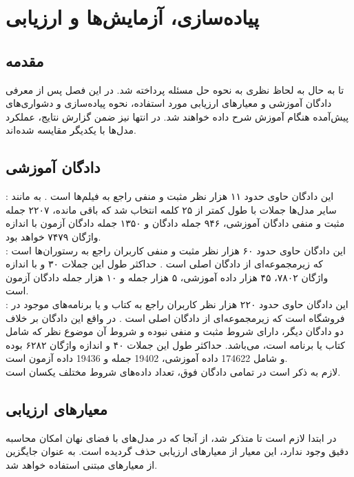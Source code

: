 \chapter{پیاده‌سازی، آزمایش‌ها و ارزیابی}\label{chap4}
\minitoc
\section{مقدمه}
تا به حال به لحاظ نظری به نحوه حل مسئله پرداخته شد. در این فصل پس از معرفی دادگان آموزشی و معیارهای ارزیابی مورد استفاده، نحوه پیاده‌سازی و دشواری‌های پیش‌آمده هنگام آموزش شرح داده خواهند شد. در انتها نیز ضمن گزارش نتایج، عملکرد مدل‌ها با یکدیگر مقایسه شده‌اند.
\section{دادگان آموزشی} \label{chap4:dataset}
:
این دادگان حاوی حدود ۱۱ هزار نظر مثبت و منفی راجع به فیلم‌ها است \cite{sst}. به مانند سایر مدل‌ها جملات با طول کمتر از ۲۵ کلمه انتخاب شد که باقی مانده، ۲۲۰۷ جمله مثبت و منفی دادگان آموزشی، ۹۴۶ جمله دادگان \validation{} و ۱۳۵۰ جمله دادگان آزمون با اندازه واژگان ۷۴۷۹ خواهد بود.
\\
:
این دادگان حاوی حدود ۶۰ هزار نظر مثبت و منفی کاربران راجع به رستوران‌ها است که زیرمجموعه‌ای از دادگان اصلی است
.
حداکثر طول این جملات ۳۰ و با اندازه واژگان ۷۸۰۲، ۴۵ هزار داده آموزشی، ۵ هزار جمله \validation{} و ۱۰ هزار جمله دادگان آزمون است.
\\
:
این دادگان حاوی حدود ۲۲۰ هزار نظر کاربران راجع به کتاب و یا برنامه‌های موجود در فروشگاه  است که زیرمجموعه‌ای از دادگان اصلی است \cite{amazon_review}. در واقع این دادگان بر خلاف دو دادگان دیگر، دارای شروط مثبت و منفی نبوده و شروط آن موضوع نظر که شامل کتاب یا برنامه است، می‌باشد. حداکثر طول این جملات ۴۰ و اندازه واژگان ۶۲۸۲ بوده و شامل 174622 داده آموزشی، 19402 جمله \validation{} و 19436 داده آزمون است.
\\
لازم به ذکر است در تمامی دادگان فوق، تعداد داده‌های شروط مختلف یکسان است.
\section{معیارهای ارزیابی} \label{chap4:metrics}
در ابتدا لازم است تا متذکر شد، از آنجا که در مدل‌های با فضای نهان امکان محاسبه دقیق \likelihood{} وجود ندارد، این معیار از معیارهای ارزیابی حذف گردیده است. به عنوان جایگزین از معیار‌های مبتنی \ngramphrase{} استفاده خواهد شد.
